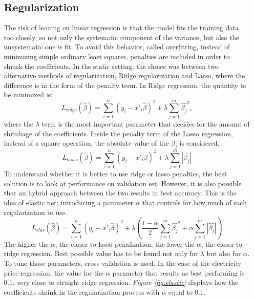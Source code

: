 \documentclass[a4paper,12pt]{book}
\begin{document}
\subsection{Regularization}

The risk of leaning on linear regression is that the model fits the training data too closely, so not only the systematic component of the variance, but also the unsystematic one is fit. To avoid this behavior, called overfitting, instead of minimizing simple ordinary least squares, penalties are included in order to shrink the coefficients. In the static setting, the choice was between two alternative methods of regularization, Ridge regularization and Lasso, where the difference is in the form of the penalty term. In Ridge regression, the quantity to be minimized is: $$L_{ridge}(\hat{\beta}) = \sum\limits_{i=1}^{n}(y_i-x'_i\hat{\beta})^2 + \lambda\sum\limits_{j=1}^{m}\hat{\beta_j}^2,$$ where the $\lambda$ term is the most important parameter that decides for the amount of shrinkage of the coefficients. Inside the penalty term of the Lasso regression, instead of a square operation, the absolute value of the $\beta_j$ is considered. $$L_{lasso}(\hat{\beta}) = \sum\limits_{i=1}^{n}(y_i-x'_i\hat{\beta})^2 + \lambda\sum\limits_{j=1}^{m}|\hat{\beta_j}|$$ To understand whether it is better to use ridge or lasso penalties, the best solution is to look at performance on validation set. However, it is also possible that an hybrid approach between the two results in best accuracy. This is the idea of elastic net: introducing a parameter $\alpha$ that controls for how much of each regularization to use. $$L_{elas}(\hat{\beta}) = \sum\limits_{i=1}^{n}(y_i-x'_i\hat{\beta})^2 + \lambda(\frac{1-\alpha}{2}\sum\limits_{j=1}^{m}\hat{\beta_j}^2 + \alpha\sum\limits_{j=1}^{m}|\hat{\beta_j}|)$$ The higher the $\alpha$, the closer to lasso penalization, the lower the $\alpha$, the closer to ridge regression. Best possible value has to be found not only for $\lambda$ but also for $\alpha$. To tune those parameters, cross validation is used. In the case of the electricity price regression, the value for the $\alpha$ parameter that results as best performing is 0.1, very close to straight ridge regression. \textit{Figure \ref{fig:elastic}} displays how the coefficients shrink in the regularization process with $\alpha$ equal to 0.1.
\end{document}

